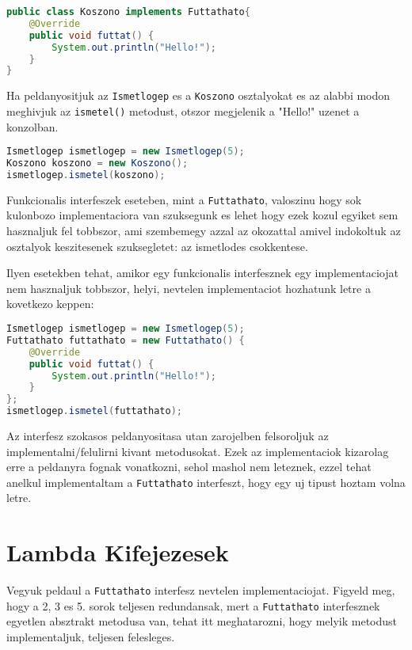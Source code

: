 \documentclass{article}
\let\l\lstinline
\begin{document}
\begin{lstlisting}[language=Java, caption=Koszono osztaly]
public class Koszono implements Futtathato{
    @Override
    public void futtat() {
        System.out.println("Hello!");
    }
}
\end{lstlisting}

Ha peldanyositjuk az \l{Ismetlogep} es a \l{Koszono} osztalyokat es az alabbi modon meghivjuk az \l{ismetel()} metodust, otszor megjelenik a "Hello!" uzenet a konzolban.

\begin{lstlisting}[language=Java, caption=Koszono osztaly es Ismetlogep hasznalata]
Ismetlogep ismetlogep = new Ismetlogep(5);
Koszono koszono = new Koszono();
ismetlogep.ismetel(koszono);
\end{lstlisting}

Funkcionalis interfeszek eseteben, mint a \l{Futtathato}, valoszinu hogy sok kulonbozo implementaciora van szuksegunk es lehet hogy ezek kozul egyiket sem hasznaljuk fel tobbszor, ami szembemegy azzal az okozattal amivel indokoltuk az osztalyok keszitesenek szuksegletet: az ismetlodes csokkentese.

Ilyen esetekben tehat, amikor egy funkcionalis interfesznek egy implementaciojat nem hasznaljuk tobbszor, helyi, nevtelen implementaciot hozhatunk letre a kovetkezo keppen:

\begin{lstlisting}[language=Java, caption=Futtathato interfesz nevtelen implementacioja]
Ismetlogep ismetlogep = new Ismetlogep(5);
Futtathato futtathato = new Futtathato() {
    @Override
    public void futtat() {
        System.out.println("Hello!");
    }
};
ismetlogep.ismetel(futtathato);
\end{lstlisting}

Az interfesz szokasos peldanyositasa utan zarojelben felsoroljuk az implementalni/felulirni kivant metodusokat. Ezek az implementaciok kizarolag erre a peldanyra fognak vonatkozni, sehol mashol nem leteznek, ezzel tehat anelkul implementaltam a \l{Futtathato} interfeszt, hogy egy uj tipust hoztam volna letre.

\newpage

\section{Lambda Kifejezesek}

Vegyuk peldaul a \l{Futtathato} interfesz nevtelen implementaciojat. Figyeld meg, hogy a 2, 3 es 5. sorok teljesen redundansak, mert a \l{Futtathato} interfesznek egyetlen absztrakt metodusa van, tehat itt meghatarozni, hogy melyik metodust implementaljuk, teljesen felesleges.
\end{document}
